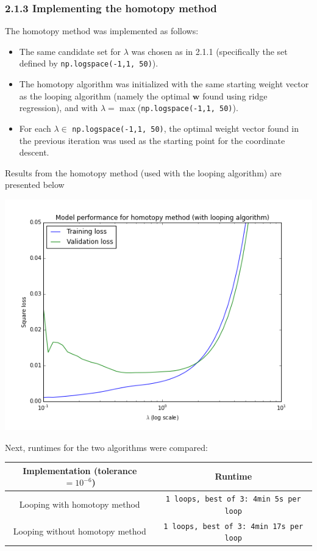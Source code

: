 \documentclass[paper=a4, fontsize=11pt]{scrartcl} %
\numberwithin{equation}{section} %
\numberwithin{figure}{section} %
\numberwithin{table}{section} %
\begin{document}
\subsubsection*{2.1.3 Implementing the homotopy method}

The homotopy method was implemented as follows:
\begin{itemize}
\item The same candidate set for $\lambda$ was chosen as in 2.1.1 (specifically the set defined by \texttt{np.logspace(-1,1, 50)}).
\item The homotopy algorithm was initialized with the same starting weight vector as the looping algorithm (namely the optimal $\bm{w}$ found using ridge regression), and with $\lambda = \max$(\texttt{np.logspace(-1,1, 50)}).
\item For each $\lambda \in $ \texttt{np.logspace(-1,1, 50)}, the optimal weight vector found in the previous iteration was used as the starting point for the coordinate descent.
\end{itemize}

Results from the homotopy method (used with the looping algorithm) are presented below

\begin{center} \includegraphics[scale=0.65]{./../figures/2_1_3.png} \end{center}

Next, runtimes for the two algorithms were compared:

\begin{center}
\begin{tabular}{| c | c |}
\hline
	\textbf{Implementation (tolerance $= 10^{-6}$) } & \textbf{Runtime}\\
\hline
	Looping with homotopy method & \texttt{1 loops, best of 3: 4min 5s per loop} \\
\hline
	Looping without homotopy method &  \texttt{1 loops, best of 3: 4min 17s per loop} \\
\hline
\end{tabular}
\end{center}
\end{document}
